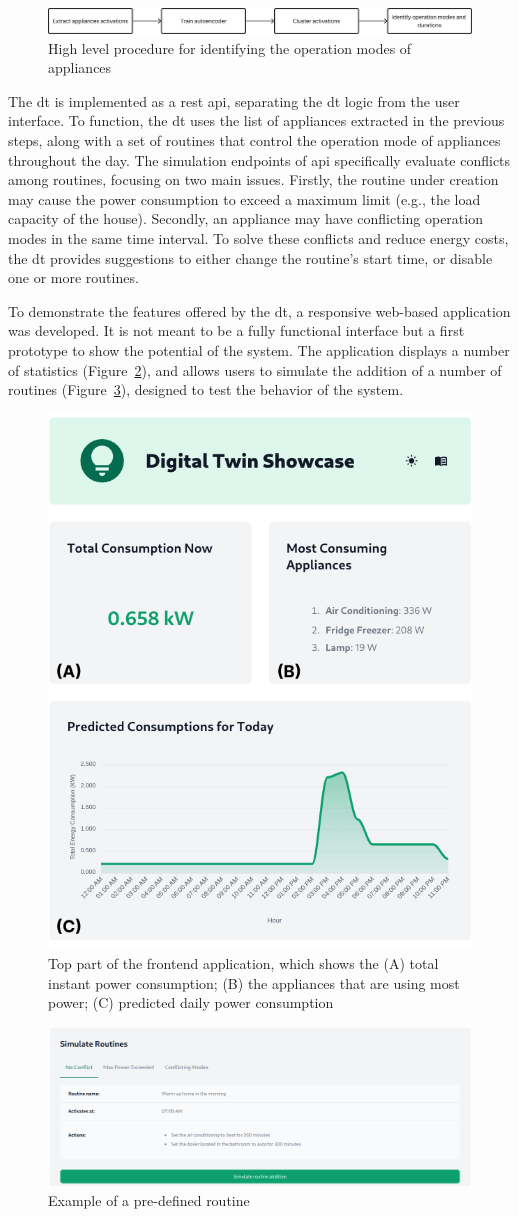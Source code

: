 \begin{figure}[b]
    \centering
    \includegraphics[width=\linewidth]{images/high_level_procedure.png}
    \caption{High level procedure for identifying the operation modes of appliances}%
    \label{fig:high-level-procedure}
\end{figure}

The \acrshort*{dt} is implemented as a \acrshort*{rest} \acrshort*{api}, separating the \acrshort*{dt} logic from the user interface. To function, the \acrshort*{dt} uses the list of appliances extracted in the previous steps, along with a set of routines that control the operation mode of appliances throughout the day. The simulation endpoints of \acrshort*{api} specifically evaluate conflicts among routines, focusing on two main issues. Firstly, the routine under creation may cause the power consumption to exceed a maximum limit (e.g., the load capacity of the house). Secondly, an appliance may have conflicting operation modes in the same time interval. To solve these conflicts and reduce energy costs, the \acrshort*{dt} provides suggestions to either change the routine's start time, or disable one or more routines.

To demonstrate the features offered by the \acrshort*{dt}, a responsive web-based application was developed. It is not meant to be a fully functional interface but a first prototype to show the potential of the system. The application displays a number of statistics (Figure~\ref{fig:frontend}), and allows users to simulate the addition of a number of routines (Figure~\ref{fig:simulate}), designed to test the behavior of the system.

\begin{figure}[htb]
    \centering
    \includegraphics[width=.45\linewidth]{images/responsive.png}
    \caption{Top part of the frontend application, which shows the (A) total instant power consumption; (B) the appliances that are using most power; (C) predicted daily power consumption}%
    \label{fig:frontend}
\end{figure}

\begin{figure}[htb]
    \centering
    \includegraphics[width=.55\linewidth]{images/simulate.png}
    \caption{Example of a pre-defined routine}%
    \label{fig:simulate}
\end{figure}

